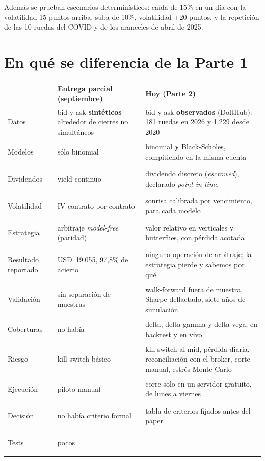 \documentclass[11pt,a4paper]{article}
\newcommand{\usd}[1]{USD~#1}
\begin{document}
Además se prueban escenarios determinísticos: caída de 15\% en un día con la volatilidad 15 puntos arriba, suba de
10\%, volatilidad +20 puntos, y la repetición de las 10 ruedas del COVID y de los aranceles de abril de 2025.

\newpage
\section{En qué se diferencia de la Parte 1}

\begin{center}
\small
\renewcommand{\arraystretch}{1.25}
\begin{tabularx}{\linewidth}{@{}>{\sffamily\bfseries\raggedright\arraybackslash\leavevmode\color{navy}}p{2.9cm}>{\raggedright\arraybackslash}X>{\raggedright\arraybackslash}X@{}}
\toprule
 & \sffamily\bfseries Entrega parcial (septiembre) & \sffamily\bfseries Hoy (Parte 2) \\
\midrule
Datos & bid y ask \textbf{sintéticos} alrededor de cierres no simultáneos & bid y ask \textbf{observados} (DoltHub): 181 ruedas en 2026 y 1.229 desde 2020 \\
Modelos & sólo binomial & binomial \textbf{y} Black-Scholes, compitiendo en la misma cuenta \\
Dividendos & yield continuo & dividendo discreto (\emph{escrowed}), declarado \emph{point-in-time} \\
Volatilidad & IV contrato por contrato & sonrisa calibrada por vencimiento, para cada modelo \\
Estrategia & arbitraje \emph{model-free} (paridad) & valor relativo en verticales y butterflies, con pérdida acotada \\
Resultado reportado & \usd{19.055}, 97,8\% de acierto & ninguna operación de arbitraje; la estrategia pierde y sabemos por qué \\
Validación & sin separación de muestras & walk-forward fuera de muestra, Sharpe deflactado, siete años de simulación \\
Coberturas & no había & delta, delta-gamma y delta-vega, en backtest y en vivo \\
Riesgo & kill-switch básico & kill-switch al mid, pérdida diaria, reconciliación con el broker, corte manual, estrés Monte Carlo \\
Ejecución & piloto manual & corre solo en un servidor gratuito, de lunes a viernes \\
Decisión & no había criterio formal & tabla de criterios fijados antes del paper \\
Tests & pocos & 184 \\
\bottomrule
\end{tabularx}
\end{center}
\end{document}
